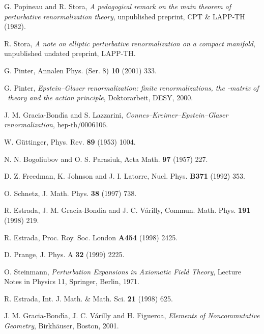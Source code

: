 \documentclass[a4paper,12pt]{article}
\providecommand{\Sf}{\mathbb{S}}       %
\providecommand{\7}{\dagger}           %
\theoremstyle{plain}
\theoremstyle{definition}
\begin{document}
\begin{thebibliography}{53}
G. Popineau and R. Stora,
\textsl{A pedagogical remark on the main theorem of perturbative
renormalization theory},
unpublished preprint, CPT \& LAPP-TH (1982).

R. Stora,
\textsl{A note on elliptic perturbative renormalization on a compact
manifold},
unpublished undated preprint, LAPP-TH.

G. Pinter,
Annalen Phys. (Ser. 8) {\bf 10} (2001) 333.

G. Pinter,
\textsl{Epstein--Glaser renormalization: finite renormalizations,
the \myHighlight{$\Sf$}\coordHE{}-matrix of \coordHE{}~theory and the action principle},
Doktorarbeit, DESY, 2000.

J. M. Gracia-Bond\'{\i}a and S. Lazzarini,
\textsl{Connes--Kreimer--Epstein--Glaser renormalization},
hep-th/0006106.

W. G\"uttinger,
Phys. Rev. {\bf 89} (1953) 1004.

N. N. Bogoliubov and O. S. Parasiuk,
Acta Math. {\bf97} (1957) 227.

D. Z. Freedman, K. Johnson and J. I. Latorre,
Nucl. Phys. {\bf B371} (1992) 353.

O. Schnetz,
J. Math. Phys. {\bf 38} (1997) 738.

R. Estrada, J. M. Gracia-Bond\'{\i}a and J. C. V\'arilly,
Commun. Math. Phys. {\bf 191} (1998) 219.

R. Estrada,
Proc. Roy. Soc. London {\bf A454} (1998) 2425.

D. Prange,
J. Phys. A {\bf 32} (1999) 2225.

O. Steinmann,
\textit{Perturbation Expansions in Axiomatic Field Theory},
Lecture Notes in Physics 11, Springer, Berlin, 1971.

R. Estrada,
Int. J. Math. \& Math. Sci. {\bf 21} (1998) 625.

J. M. Gracia-Bond\'{\i}a, J. C. V\'arilly and H. Figueroa,
\textit{Elements of Noncommutative Geometry},
Birkh\"auser, Boston, 2001.


\end{thebibliography}
\end{document}

